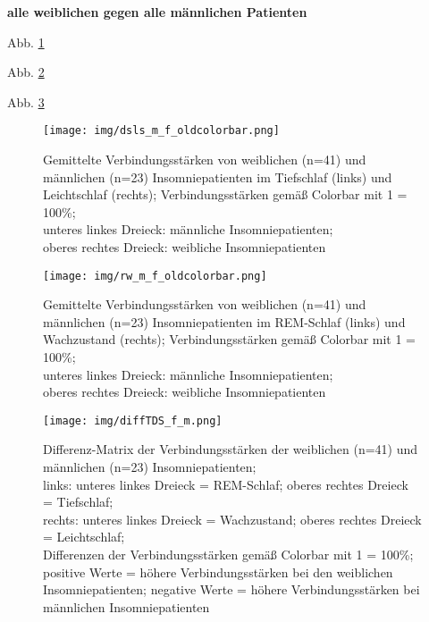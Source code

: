 \textbf{alle weiblichen gegen alle männlichen Patienten}

Abb. \ref{fig:dsls_m_f}

Abb. \ref{fig:rw_m_f}

Abb. \ref{fig:diffTDS_f_m}

\begin{figure}[H]
	\centering
	\texttt{[image: img/dsls\_m\_f\_oldcolorbar.png]}
	\caption[Verbindungsstärken von weiblichen und männlichen Insomniepatienten]{Gemittelte Verbindungsstärken von weiblichen (n=41) und männlichen (n=23) Insomniepatienten im Tiefschlaf (links) und Leichtschlaf (rechts); Verbindungsstärken gemäß Colorbar mit 1 = 100\%;\\unteres linkes Dreieck: männliche Insomniepatienten;\\oberes rechtes Dreieck: weibliche Insomniepatienten}
	\label{fig:dsls_m_f}
\end{figure}

\begin{figure}[H]
	\centering
	\texttt{[image: img/rw\_m\_f\_oldcolorbar.png]}
	\caption[Verbindungsstärken von weiblichen und männlichen Insomniepatienten]{Gemittelte Verbindungsstärken von weiblichen (n=41) und männlichen (n=23) Insomniepatienten im REM-Schlaf (links) und Wachzustand (rechts); Verbindungsstärken gemäß Colorbar mit 1 = 100\%;\\unteres linkes Dreieck: männliche Insomniepatienten;\\oberes rechtes Dreieck: weibliche Insomniepatienten}
	\label{fig:rw_m_f}
\end{figure}

\begin{figure}[H]
	\centering
	\texttt{[image: img/diffTDS\_f\_m.png]}
	\caption[Differenz-Matrix der Verbindungsstärken der weiblichen und männlichen Insomniepatienten]{Differenz-Matrix der Verbindungsstärken der weiblichen (n=41) und männlichen (n=23) Insomniepatienten;\\links: unteres linkes Dreieck = REM-Schlaf; oberes rechtes Dreieck = Tiefschlaf;\\rechts: unteres linkes Dreieck = Wachzustand; oberes rechtes Dreieck = Leichtschlaf;\\Differenzen der Verbindungsstärken gemäß Colorbar mit 1 = 100\%;\\positive Werte = höhere Verbindungsstärken bei den weiblichen Insomniepatienten; negative Werte = höhere Verbindungsstärken bei männlichen Insomniepatienten}
	\label{fig:diffTDS_f_m}
\end{figure}




